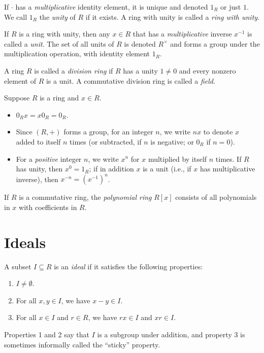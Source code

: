 \begin{definition}
	If $\cdot$ has a \emph{multiplicative} identity element, it is unique and
	denoted $1_R$ or just $1$. We call $1_R$ the \emph{unity} of $R$ if it exists.
	A ring with unity is called a \emph{ring with unity}.
\end{definition}

\begin{definition}
	If $R$ is a ring with unity, then any $x \in R$ that has a
	\emph{multiplicative} inverse $x^{-1}$ is called a \emph{unit}. The set of all
	units of $R$ is denoted $R^\times$ and forms a group under the multiplication
	operation, with identity element $1_R$.
\end{definition}

\begin{definition}
	A ring $R$ is called a \emph{division ring} if $R$ has a unity $1 \neq 0$ and
	every nonzero element of $R$ is a unit. A commutative division ring is called
	a \emph{field}.
\end{definition}

\begin{facts}
	Suppose $R$ is a ring and $x \in R$.
	\begin{itemize}
		\item $0_R x = x 0_R = 0_R$.
		\item Since $(R, +)$ forms a group, for an integer $n$, we write $nx$ to
			denote $x$ added to itself $n$ times (or subtracted, if $n$ is negative;
			or $0_R$ if $n = 0$).
		\item For a \emph{positive} integer $n$, we write $x^n$ for $x$ multiplied
			by itself $n$ times. If $R$ has unity, then $x^0 = 1_R$; if in addition
			$x$ is a unit (i.e., if $x$ has multiplicative inverse), then $x^{-n} =
			{(x^{-1})}^n$.
	\end{itemize}
\end{facts}

\begin{definition}
	If $R$ is a commutative ring, the \emph{polynomial ring} $R[x]$ consists of
	all polynomials in $x$ with coefficients in $R$.
\end{definition}

\section*{Ideals}

\begin{definition}
	A subset $I \subseteq R$ is an \emph{ideal} if it satisfies the following
	properties:
	\begin{enumerate}
		\item $I \neq \emptyset$.
		\item For all $x, y \in I$, we have $x - y \in I$.
		\item For all $x \in I$ and $r \in R$, we have $rx \in I$ and $xr \in I$.
	\end{enumerate}
	Properties 1 and 2 say that $I$ is a subgroup under addition, and property 3
	is sometimes informally called the ``sticky'' property.
\end{definition}

